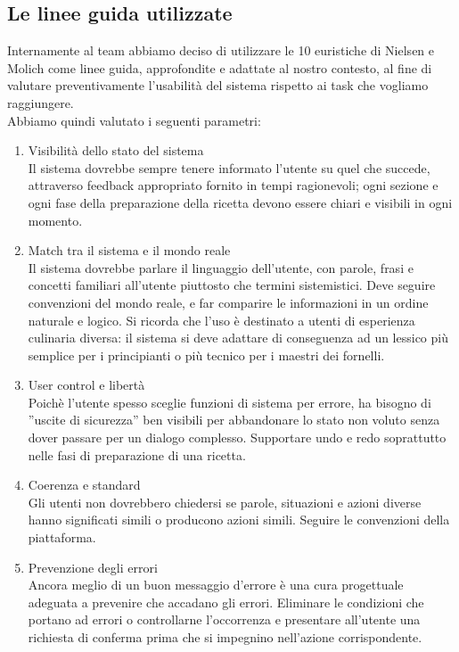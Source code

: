 \subsection{Le linee guida utilizzate}
Internamente al team abbiamo deciso di utilizzare le 10 euristiche di Nielsen e Molich come linee guida, approfondite e adattate al nostro contesto, al fine di valutare preventivamente l’usabilità del sistema rispetto ai task che vogliamo raggiungere.\\
Abbiamo quindi valutato i seguenti parametri:
\begin{enumerate}

\item Visibilità dello stato del sistema\\
Il sistema dovrebbe sempre tenere informato l’utente su quel che succede,
attraverso feedback appropriato fornito in tempi ragionevoli; ogni sezione e ogni fase della preparazione della ricetta devono essere chiari e visibili in ogni momento.

\item Match tra il sistema e il mondo reale\\
Il sistema dovrebbe parlare il linguaggio dell’utente, con parole, frasi e
concetti familiari all’utente piuttosto che termini sistemistici. Deve seguire
convenzioni del mondo reale, e far comparire le informazioni in un ordine
naturale e logico. Si ricorda che l'uso è destinato a utenti di esperienza culinaria diversa: il sistema si deve adattare di conseguenza ad un lessico più semplice per i principianti o più tecnico per i maestri dei fornelli. \\

\item User control e libertà\\
Poichè l’utente spesso sceglie funzioni di sistema per errore, ha bisogno
di ”uscite di sicurezza” ben visibili per abbandonare lo stato non voluto
senza dover passare per un dialogo complesso. Supportare undo e redo soprattutto nelle fasi di preparazione di una ricetta.\\

\item Coerenza e standard\\
Gli utenti non dovrebbero chiedersi se parole, situazioni e azioni diverse
hanno significati simili o producono azioni simili. Seguire le convenzioni
della piattaforma.\\

\item Prevenzione degli errori\\
Ancora meglio di un buon messaggio d’errore è una cura progettuale adeguata a prevenire che accadano gli errori. Eliminare le condizioni che portano ad errori o controllarne l’occorrenza e presentare all’utente una richiesta di conferma prima che si impegnino nell’azione corrispondente.\\


\end{enumerate}
